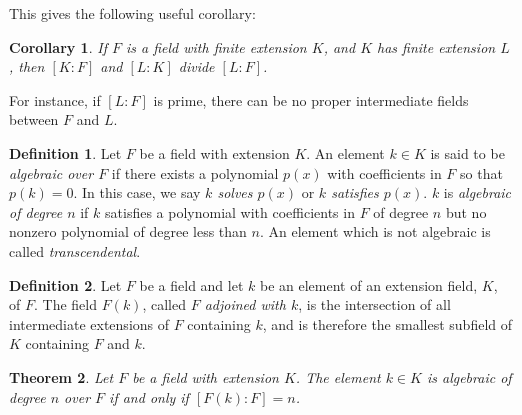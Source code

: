 \documentclass[12pt,leqno]{article}
\numberwithin{equation}{section}
\theoremstyle{plain}
\newtheorem{thm}{Theorem}[section]
\newtheorem{cor}[thm]{Corollary}
\theoremstyle{definition}
\newtheorem*{Def}{Definition}
\theoremstyle{remark}
\begin{document}
This gives the following useful corollary:
\begin{cor}
 If $F$ is a field with finite extension $K$, and $K$ has finite extension $L$, then $[K:F]$ and $[L:K]$ divide $[L:F]$.
\end{cor}

For instance, if $[L:F]$ is prime, there can be no proper intermediate fields between $F$ and $L$.

\begin{Def}
 Let $F$ be a field with extension $K$. An element $k\in K$ is said to be \textit{algebraic over $F$} if there exists a polynomial $p(x)$ with coefficients in $F$ so that $p(k)=0$. In this case, we say \textit{$k$ solves $p(x)$} or \textit{$k$ satisfies $p(x)$}. $k$ is \textit{algebraic of degree $n$} if $k$ satisfies a polynomial with coefficients in $F$ of degree $n$ but no nonzero polynomial of degree less than $n$. An element which is not algebraic is called \textit{transcendental}.
\end{Def}

\begin{Def}
 Let $F$ be a field and let $k$ be an element of an extension field, $K$, of $F$. The field $F(k)$, called \textit{$F$ adjoined with $k$}, is the intersection of all intermediate extensions of $F$ containing $k$, and is therefore the smallest subfield of $K$ containing $F$ and $k$. 
\end{Def}

\begin{thm}
 Let $F$ be a field with extension $K$. The element $k\in K$ is algebraic of degree $n$ over $F$ if and only if $[F(k):F]=n$. 
\end{thm}
\end{document}
